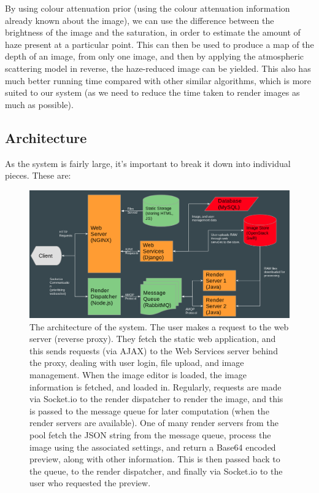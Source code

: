 \documentclass[12pt,a4paper]{article}
\begin{document}
By using colour attenuation prior (using the colour attenuation information already known about the image), we can use the difference between the brightness of the image and the saturation, in order to estimate the amount of haze present at a particular point. This can then be used to produce a map of the depth of an image, from only one image, and then by applying the atmospheric scattering model in reverse, the haze-reduced image can be yielded. This also has much better running time compared with other similar algorithms, which is more suited to our system (as we need to reduce the time taken to render images as much as possible). \cite{ColourAttenuationPriorAlg}

\subsection{Architecture}
As the system is fairly large, it's important to break it down into individual pieces. These are:
\begin{figure}[h]
    \centering
    \includegraphics[width=1\textwidth]{architecturediagram}
    \caption{The architecture of the system. The user makes a request
    to the web server (reverse proxy). They fetch the static web application, and this sends requests (via AJAX) to the Web Services server behind the proxy, dealing with user login, file upload, and image management. When the image editor is loaded, the image information is fetched, and loaded in. Regularly, requests are made via Socket.io to the render dispatcher to render the image, and this is passed to the message queue for later computation (when the render servers are available). One of many render servers from the pool fetch the JSON string from the message queue, process the image using the associated settings, and return a Base64 encoded preview, along with other information. This is then passed back to the queue, to the render dispatcher, and finally via Socket.io to the user who requested the preview.}
    \label{ArchitectureDiagram}
\end{figure}
\end{document}
